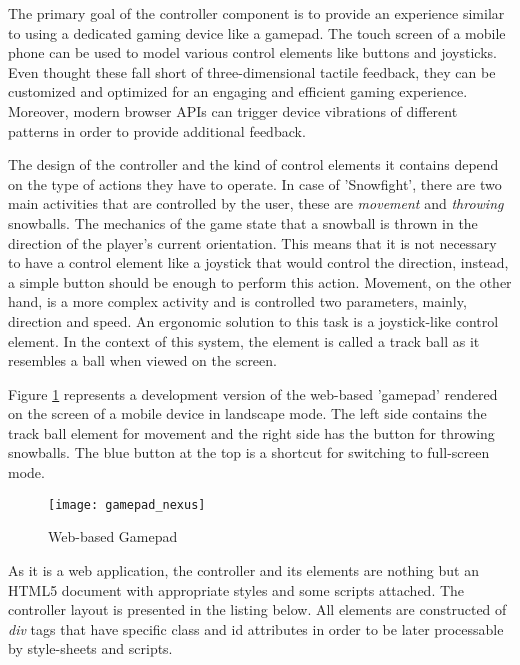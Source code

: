 The primary goal of the controller component is to provide an experience similar
to using a dedicated gaming device like a gamepad. The touch screen of a mobile
phone can be used to model various control elements like buttons and joysticks.
Even thought these fall short of three-dimensional tactile feedback, they can be
customized and optimized for an engaging and efficient gaming experience.
Moreover, modern browser APIs can trigger device vibrations of different
patterns in order to provide additional feedback.

The design of the controller and the kind of control elements it contains depend
on the type of actions they have to operate. In case of 'Snowfight', there are
two main activities that are controlled by the user, these are \emph{movement}
and \emph{throwing} snowballs. The mechanics of the game state that a snowball
is thrown in the direction of the player's current orientation. This means that
it is not necessary to have a control element like a joystick that would control
the direction, instead, a simple button should be enough to perform this action.
Movement, on the other hand, is a more complex activity and is controlled two
parameters, mainly, direction and speed. An ergonomic solution to this task is a
joystick-like control element. In the context of this system, the element is
called a track ball as it resembles a ball when viewed on the screen.

Figure \ref{fig:gamepad} represents a development version of the web-based
'gamepad' rendered on the screen of a mobile device in landscape mode. The left
side contains the track ball element for movement and the right side has the
button for throwing snowballs. The blue button at the top is a shortcut for
switching to full-screen mode.

\begin{figure}[!h]
\centering
\texttt{[image: gamepad\_nexus]}
\caption{Web-based Gamepad}\label{fig:gamepad}
\end{figure}

As it is a web application, the controller and its elements are nothing but an
HTML5 document with appropriate styles and some scripts attached. The controller
layout is presented in the listing below. All elements are constructed of
\emph{div} tags that have specific class and id attributes in order to be later
processable by style-sheets and scripts.




